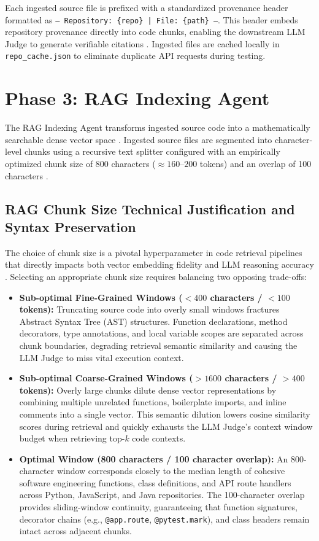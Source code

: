 Each ingested source file is prefixed with a standardized provenance header formatted as \texttt{--- Repository: \{repo\} | File: \{path\} ---}. This header embeds repository provenance directly into code chunks, enabling the downstream LLM Judge to generate verifiable citations \cite{ref25}. Ingested files are cached locally in \texttt{repo\_cache.json} to eliminate duplicate API requests during testing.

\section{Phase 3: RAG Indexing Agent}

The RAG Indexing Agent transforms ingested source code into a mathematically searchable dense vector space \cite{ref30, ref31, ref32}. Ingested source files are segmented into character-level chunks using a recursive text splitter configured with an empirically optimized chunk size of 800 characters ($\approx 160$--$200$ tokens) and an overlap of 100 characters \cite{ref30, ref41}.

\subsection{RAG Chunk Size Technical Justification and Syntax Preservation}

The choice of chunk size is a pivotal hyperparameter in code retrieval pipelines that directly impacts both vector embedding fidelity and LLM reasoning accuracy \cite{ref33, ref37}. Selecting an appropriate chunk size requires balancing two opposing trade-offs:
\begin{itemize}[leftmargin=*]
    \item \textbf{Sub-optimal Fine-Grained Windows ($<400$ characters / $<100$ tokens):} Truncating source code into overly small windows fractures Abstract Syntax Tree (AST) structures. Function declarations, method decorators, type annotations, and local variable scopes are separated across chunk boundaries, degrading retrieval semantic similarity and causing the LLM Judge to miss vital execution context.
    \item \textbf{Sub-optimal Coarse-Grained Windows ($>1600$ characters / $>400$ tokens):} Overly large chunks dilute dense vector representations by combining multiple unrelated functions, boilerplate imports, and inline comments into a single vector. This semantic dilution lowers cosine similarity scores during retrieval and quickly exhausts the LLM Judge's context window budget when retrieving top-$k$ code contexts.
    \item \textbf{Optimal Window (800 characters / 100 character overlap):} An 800-character window corresponds closely to the median length of cohesive software engineering functions, class definitions, and API route handlers across Python, JavaScript, and Java repositories. The 100-character overlap provides sliding-window continuity, guaranteeing that function signatures, decorator chains (e.g., \texttt{@app.route}, \texttt{@pytest.mark}), and class headers remain intact across adjacent chunks.
\end{itemize}

